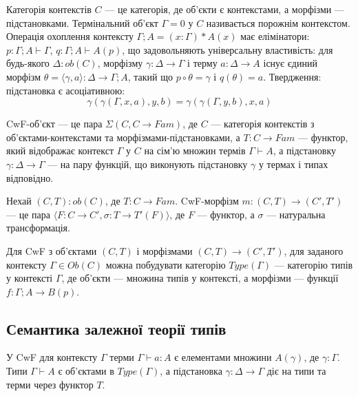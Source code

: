\documentclass{article}
\begin{document}
\begin{definition}[Контекст]
Категорія контекстів $C$ --- це категорія, де об’єкти є контекстами, а морфізми --- підстановками. Термінальний об’єкт $\Gamma=0$ у $C$ називається порожнім контекстом. Операція охоплення контексту $\Gamma;A = (x:\Gamma)*A(x)$ має елімінатори: $p:\Gamma;A\vdash\Gamma$, $q:\Gamma;A\vdash A(p)$, що задовольняють універсальну властивість: для будь-якого $\Delta:ob(C)$, морфізму $\gamma:\Delta\rightarrow\Gamma$ і терму $a:\Delta\rightarrow A$ існує єдиний морфізм $\theta=\langle\gamma,a\rangle:\Delta\rightarrow\Gamma;A$, такий що $p\circ\theta=\gamma$ і $q(\theta)=a$. Твердження: підстановка є асоціативною:
\[
    \gamma(\gamma(\Gamma,x,a),y,b) = \gamma(\gamma(\Gamma,y,b),x,a)
\]
\end{definition}

\begin{definition}
CwF-об’єкт --- це пара $\Sigma(C, C\rightarrow Fam)$, де $C$ --- категорія контекстів з об’єктами-контекстами та морфізмами-підстановками, а $T:C\rightarrow Fam$ --- функтор, який відображає контекст $\Gamma$ у $C$ на сім’ю множин термів $\Gamma\vdash A$, а підстановку $\gamma:\Delta\rightarrow\Gamma$ --- на пару функцій, що виконують підстановку $\gamma$ у термах і типах відповідно.
\end{definition}

\begin{definition}
Нехай $(C,T):ob(C)$, де $T:C\rightarrow Fam$. CwF-морфізм $m: (C,T)\rightarrow(C',T')$ --- це пара $\langle F:C\rightarrow C', \sigma:T\rightarrow T'(F) \rangle$, де $F$ --- функтор, а $\sigma$ --- натуральна трансформація.
\end{definition}

\begin{definition}
Для CwF з об’єктами $(C,T)$ і морфізмами $(C,T)\rightarrow(C',T')$, для заданого контексту $\Gamma \in Ob(C)$ можна побудувати категорію $Type(\Gamma)$ --- категорію типів у контексті $\Gamma$, де об’єкти --- множина типів у контексті, а морфізми --- функції $f:\Gamma;A\rightarrow B(p)$.
\end{definition}

\subsection{Семантика залежної теорії типів}

\begin{definition}
У CwF для контексту $\Gamma$ терми $\Gamma\vdash a:A$ є елементами множини $A(\gamma)$, де $\gamma:\Gamma$. Типи $\Gamma\vdash A$ є об’єктами в $Type(\Gamma)$, а підстановка $\gamma:\Delta\rightarrow\Gamma$ діє на типи та терми через функтор $T$.
\end{definition}
\end{document}
